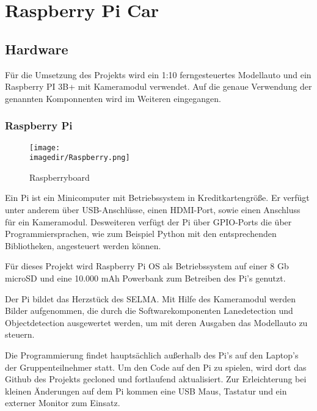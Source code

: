 \chapter{Raspberry Pi Car}



\section{Hardware}
Für die Umsetzung des Projekts wird ein 1:10 ferngesteuertes Modellauto und ein Raspberry PI 3B+ mit Kameramodul verwendet. Auf die genaue Verwendung der genannten Komponnenten wird im Weiteren eingegangen. 

\subsection{Raspberry Pi}
\begin{figure}
\centering
\texttt{[image: \\imagedir/Raspberry.png]}
\caption{Raspberryboard \autocite[VglRaspberrboard]{https://www.raspberrypi.org/documentation/usage/gpio}} 
\end{figure}
Ein \ac{Pi} ist ein Minicomputer mit Betriebssystem in Kreditkartengröße. Er verfügt unter anderem über USB-Anschlüsse, einen HDMI-Port, sowie einen Anschluss für ein Kameramodul. Desweiteren verfügt der \ac{Pi} über \ac{GPIO}-Ports die über Programmiersprachen, wie zum Beispiel Python mit den entsprechenden Bibliotheken, angesteuert werden können. 

Für dieses Projekt wird Raspberry Pi OS als Betriebssystem auf einer 8 Gb microSD und eine 10.000 mAh Powerbank zum Betreiben des \ac{Pi}'s genutzt.

Der \ac{Pi} bildet das Herzstück des \ac{SELMA}. Mit Hilfe des Kameramodul werden Bilder aufgenommen, die durch die Softwarekomponenten Lanedetection und Objectdetection ausgewertet werden, um mit deren Ausgaben das Modellauto zu steuern.

Die Programmierung findet hauptsächlich außerhalb des \ac{Pi}'s auf den Laptop's der Gruppenteilnehmer statt. Um den Code auf den \ac{Pi} zu spielen, wird dort das Github des Projekts gecloned und fortlaufend aktualisiert. Zur Erleichterung bei kleinen Änderungen auf dem \ac{Pi} kommen eine USB Maus, Tastatur und ein externer Monitor zum Einsatz.

